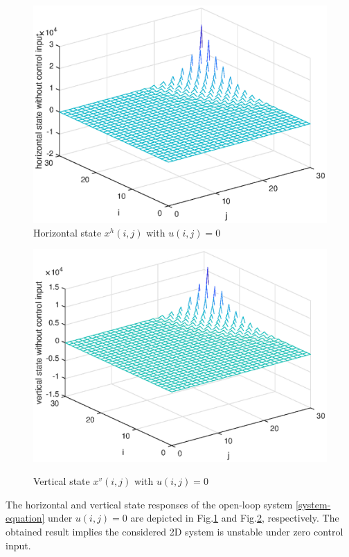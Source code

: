\documentclass[conference]{IEEEtran}
\begin{document}
\begin{figure}[!htb]
\centering\includegraphics[scale=0.6]{./simulations/hx-no-controll-input.eps}
\caption{ Horizontal state $x^{h}(i,j)$ with $u(i,j)=0$}
\label{fig3}
\end{figure}
\begin{figure}[!htb]
\centering\includegraphics[scale=0.6]{./simulations/vx-no-controll-input.eps}\\ 
\caption{Vertical state $x^{v}(i,j)$ with $u(i,j)=0$}
\label{fig4}
\end{figure}
 The horizontal and vertical state responses of the open-loop system \eqref{system-equation} under $u(i,j) = 0$ are depicted in Fig.\ref{fig3} and Fig.\ref{fig4}, respectively. The obtained result implies the considered 2D system is unstable under zero control input. 
\end{document}
